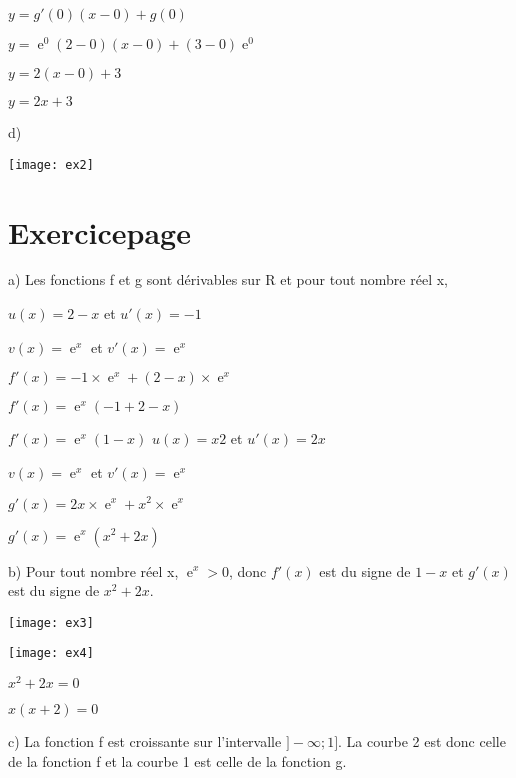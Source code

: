 \documentclass[a4paper,10pt,french,twocolumn]{scrartcl}
\DeclareMathOperator{\e}{e}
\begin{document}
$y = g'(0)(x-0)+g(0)$

$y = \e^0(2-0)(x-0)+(3-0)\e^0$

$y = 2(x-0)+3$

$y = 2x+3$

\bigbreak
d)

\texttt{[image: ex2]}

\section{Exercice\:page}
a) Les fonctions f et g sont dérivables sur R et
pour tout nombre réel x,

$u(x) = 2 - x$ et $u'(x) = - 1$

$v(x) = \e^x$ et $v'(x) = \e^x$

$f'(x) = -1 \times \e^x + (2 - x) \times \e^x$

$f'(x) = \e^x ( -1 + 2 - x)$

$f'(x) = \e^x ( 1 - x)$
\bigbreak
$u(x) = x2$ et $u'(x) = 2 x$

$v(x) = \e^x$ et $v'(x) = \e^x$

$g'(x) = 2x \times \e^x + x^2 \times \e^x$

$g'(x) = \e^x (x^2 + 2 x )$

\bigbreak
b) Pour tout nombre réel x, $\e^x > 0$, donc $f'(x)$ est du signe de $1- x$ et $g'(x)$ est du signe de $x^2 + 2x$.

\texttt{[image: ex3]}

\texttt{[image: ex4]}

$x^2 + 2x =0$

$x(x+2) = 0$

\bigbreak

c) La fonction f est croissante sur l’intervalle $]- \infty ; 1]$.
La courbe 2 est donc celle de la fonction f et la courbe 1 est celle de la fonction g.
\end{document}
